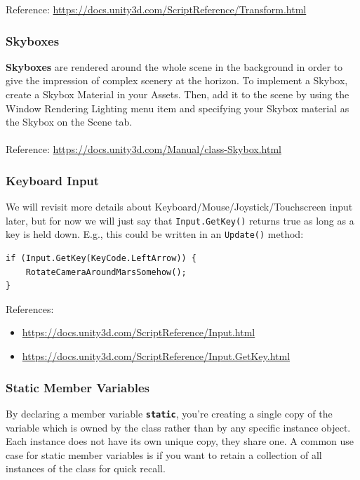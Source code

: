 \documentclass[a4paper,11pt]{article}
\begin{document}
Reference: \url{https://docs.unity3d.com/ScriptReference/Transform.html}

\subsubsection{Skyboxes}
\textbf{Skyboxes} are rendered around the whole scene in the background in order to give the impression of complex scenery at 
the horizon. 
To implement a Skybox, create a Skybox Material in your Assets. 
Then, add it to the scene by using the Window {\rightarrow} Rendering {\rightarrow} Lighting menu item and specifying your Skybox 
material as the Skybox on the Scene tab.
\\\\
Reference: \url{https://docs.unity3d.com/Manual/class-Skybox.html}

\subsubsection{Keyboard Input}
We will revisit more details about Keyboard/Mouse/Joystick/Touchscreen input later, but for now we will just say that 
\verb|Input.GetKey()| returns true as long as a key is held down. 
E.g., this could be written in an \verb|Update()| method: 
\begin{verbatim}
if (Input.GetKey(KeyCode.LeftArrow)) {
    RotateCameraAroundMarsSomehow();
}
\end{verbatim}

References:
\begin{itemize}
    \item   \url{https://docs.unity3d.com/ScriptReference/Input.html}
    \item   \url{https://docs.unity3d.com/ScriptReference/Input.GetKey.html}
\end{itemize}

\subsubsection{Static Member Variables}
By declaring a member variable \textbf{\texttt{static}}, you're creating a single copy of the variable which is owned by the
class rather than by any specific instance object. 
Each instance does not have its own unique copy, they share one.
A common use case for static member variables is if you want to retain a collection of all instances of the class for quick 
recall.
\end{document}
